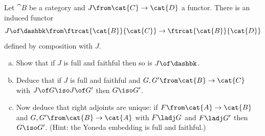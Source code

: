 \begin{question}        
\label{ex:adjts-unique}
Let $\cat{B}$ be a category and $J\from \cat{C} \to \cat{D}$ a functor.
There is an induced functor
\[
J \of \dashbk\from \ftrcat{\cat{B}}{\cat{C}} \to \ftrcat{\cat{B}}{\cat{D}}
\]
defined by composition with $J$.  
% 
\begin{enumerate}[(b)]
\item 
Show that if $J$ is full and faithful then so is $J\of\dashbk$.

\item 
Deduce that if $J$ is full and faithful and $G, G'\from \cat{B} \to
\cat{C}$ with $J \of G \iso J \of G'$ then $G \iso G'$.

\item 
Now deduce that right adjoints are unique:%
%
%
if $F\from \cat{A} \to \cat{B}$ and $G, G'\from \cat{B} \to \cat{A}$ with
$F \ladj G$ and $F \ladj G'$ then $G \iso G'$.  (Hint: the Yoneda embedding
is full and faithful.)
\end{enumerate}
\end{question}



